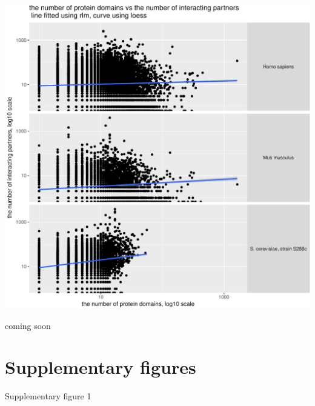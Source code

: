 \documentclass[]{article}
\begin{document}
\includegraphics{final_report_files/figure-latex/N_domain_vs_n_interactions-1.pdf}

coming soon

\section{Supplementary figures}\label{supplementary-figures}

Supplementary figure 1
\end{document}
